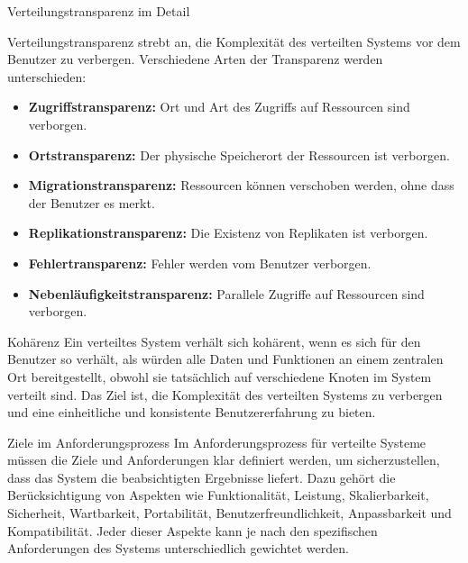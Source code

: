 \documentclass{beamer}
\begin{document}
\begin{frame}{Verteilungstransparenz im Detail}

Verteilungstransparenz strebt an, die Komplexität des verteilten Systems vor dem Benutzer zu verbergen.  Verschiedene Arten der Transparenz werden unterschieden:

    \begin{itemize}
        \item \textbf{Zugriffstransparenz:}  Ort und Art des Zugriffs auf Ressourcen sind verborgen.
        \item \textbf{Ortstransparenz:} Der physische Speicherort der Ressourcen ist verborgen.
        \item \textbf{Migrationstransparenz:}  Ressourcen können verschoben werden, ohne dass der Benutzer es merkt.
        \item \textbf{Replikationstransparenz:}  Die Existenz von Replikaten ist verborgen.
        \item \textbf{Fehlertransparenz:}  Fehler werden vom Benutzer verborgen.
        \item \textbf{Nebenläufigkeitstransparenz:} Parallele Zugriffe auf Ressourcen sind verborgen.
    \end{itemize}

\end{frame}


\begin{frame}{Kohärenz}
  Ein verteiltes System verhält sich kohärent, wenn es sich für den Benutzer so verhält, als würden alle Daten und Funktionen an einem zentralen Ort bereitgestellt, obwohl sie tatsächlich auf verschiedene Knoten im System verteilt sind.  Das Ziel ist, die Komplexität des verteilten Systems zu verbergen und eine einheitliche und konsistente Benutzererfahrung zu bieten.
\end{frame}



\begin{frame}{Ziele im Anforderungsprozess}
    Im Anforderungsprozess für verteilte Systeme müssen die Ziele und Anforderungen klar definiert werden, um sicherzustellen, dass das System die beabsichtigten Ergebnisse liefert.  Dazu gehört die Berücksichtigung von Aspekten wie Funktionalität, Leistung, Skalierbarkeit, Sicherheit, Wartbarkeit, Portabilität, Benutzerfreundlichkeit, Anpassbarkeit und Kompatibilität.  Jeder dieser Aspekte kann je nach den spezifischen Anforderungen des Systems unterschiedlich gewichtet werden.
\end{frame}
\end{document}
